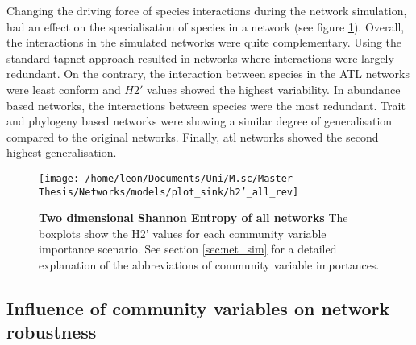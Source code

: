 \documentclass[12pt,a4paper]{article}
\begin{document}
Changing the driving force of species interactions during the network simulation, had an effect on the specialisation of species in a network (see figure \ref{fig:h2}). Overall, the interactions in the simulated networks were quite complementary. Using the standard tapnet approach resulted in networks where interactions were largely redundant. On the contrary, the interaction between species in the ATL networks were least conform and $H2'$ values showed the highest variability. In abundance based networks, the interactions between species were the most redundant. Trait and phylogeny based networks were showing a similar degree of generalisation compared to the original networks. Finally, atl networks showed the second highest generalisation.

\begin{figure}[H]
	 \centering
	 \texttt{[image: /home/leon/Documents/Uni/M.sc/Master Thesis/Networks/models/plot\_sink/h2'\_all\_rev]}
	 \captionsetup{width = .8\textwidth}
	 \caption[Two dimensional Shannon Entropy of all networks]{\textbf{Two dimensional Shannon Entropy of all networks} The boxplots show the H2' values \parencite{Bluethgen2006} for each community variable importance scenario. See section \ref{sec:net_sim} for a detailed explanation of the abbreviations of community variable importances.}
	 \label{fig:h2}
\end{figure}

\subsection{Influence of community variables on network robustness}
\end{document}
